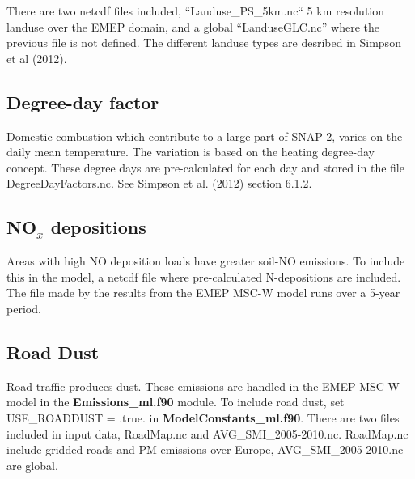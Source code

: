 There are two netcdf files included, ``Landuse\_PS\_5km.nc`` 5 km resolution 
landuse over the EMEP domain, and a global ``LanduseGLC.nc'' where the previous 
file is not defined. The different landuse types are desribed in Simpson et al (2012). 

% 

\subsection{Degree-day factor}
Domestic combustion which contribute to a large part of SNAP-2, varies on the daily 
mean temperature. The variation is based on the heating degree-day concept. These 
degree days are pre-calculated for each day and stored in the file DegreeDayFactors.nc. 
See Simpson et al. (2012) section 6.1.2. 


\subsection{NO$_x$ depositions}
Areas with high NO deposition loads have greater soil-NO emissions. To include this in 
the model, a netcdf file where pre-calculated N-depositions are included. The file made by 
the results from the EMEP MSC-W model runs over a 5-year period. 


\subsection{Road Dust}
Road traffic produces dust. These emissions are handled in the EMEP MSC-W model in the 
{\bf Emissions\_ml.f90} module. To include road dust, set USE\_ROADDUST = .true. in 
 { \bf ModelConstants\_ml.f90}. There are two files included in input data, RoadMap.nc and 
AVG\_SMI\_2005-2010.nc. RoadMap.nc include gridded roads and PM emissions over Europe, 
AVG\_SMI\_2005-2010.nc are global. 

